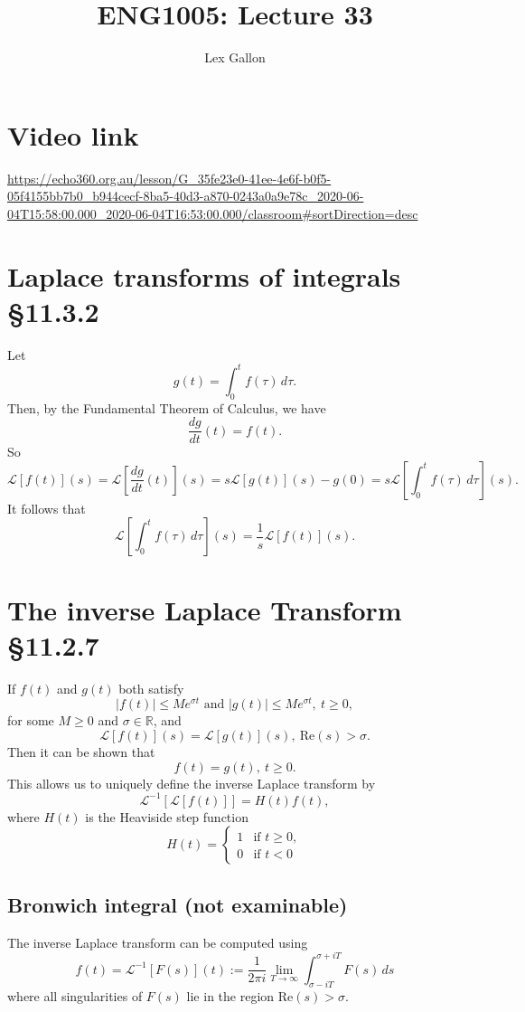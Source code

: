 \documentclass[11pt]{article}
\newcommand{\reals}{\mathbb{R}}
\newcommand{\Laplace}{\mathscr{L}}
\begin{document}
\title{ENG1005: Lecture 33}
\author{Lex Gallon}
\maketitle

\tableofcontents

\section*{Video link}
\url{https://echo360.org.au/lesson/G_35fe23e0-41ee-4e6f-b0f5-05f4155bb7b0_b944cecf-8ba5-40d3-a870-0243a0a9e78c_2020-06-04T15:58:00.000_2020-06-04T16:53:00.000/classroom#sortDirection=desc}

\section{Laplace transforms of integrals §11.3.2}
Let
\[ g(t) = \int_0^t f(\tau)\, d\tau. \]
Then, by the Fundamental Theorem of Calculus, we have
\[\frac{dg}{dt}(t) = f(t).  \]
So
\[ \Laplace[f(t)](s) = \Laplace \left[ \frac{dg}{dt}(t) \right](s) = s\Laplace[g(t)](s) - g(0) = s\Laplace \left[ \int_0^t f(\tau)\, d\tau \right](s). \]
It follows that
\[ \Laplace \left[ \int_0^t f(\tau)\, d\tau \right](s) = \frac{1}{s} \Laplace[f(t)](s). \]

\section{The inverse Laplace Transform §11.2.7}
If $f(t)$ and $g(t)$ both satisfy 
\[ |f(t)| \leq Me^{\sigma t} \text{ and } |g(t)| \leq Me^{\sigma t},\ t \geq 0, \]
for some $M \geq 0$ and $\sigma \in \reals$, and
\[ \Laplace[f(t)](s) = \Laplace[g(t)](s),\ \text{Re}(s) > \sigma. \]
Then it can be shown that
\[ f(t) = g(t),\ t \geq 0. \]
This allows us to uniquely define the inverse Laplace transform by
\[ \Laplace^{-1}[\Laplace[f(t)]] = H(t)f(t), \]
where $H(t)$ is the Heaviside step function
\[ H(t) = \begin{cases}
1 &\text{if } t \geq 0, \\
0 &\text{if } t < 0
\end{cases} \]

\subsection{Bronwich integral (not examinable)}
The inverse Laplace transform can be computed using
\[ f(t) = \Laplace^{-1}[F(s)](t) := \frac{1}{2\pi i} \lim_{T \rightarrow \infty } \int_{\sigma -iT}^{\sigma + iT} F(s)\, ds \]
where all singularities of $F(s)$ lie in the region $\text{Re}(s) > \sigma$.
\end{document}
